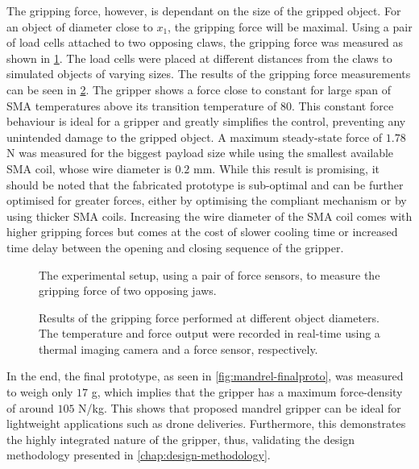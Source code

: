 The gripping force, however, is dependant on the size of the gripped object. For an object of diameter close to $x_1$, the gripping force will be maximal. Using a pair of load cells attached to two opposing claws, the gripping force was measured as shown in \cref{fig:mandrel-forcesetup}. The load cells were placed at different distances from the claws to simulated objects of varying sizes. The results of the gripping force measurements can be seen in \cref{fig:mandrel-force-temp}. The gripper shows a force close to constant for large span of SMA temperatures above its transition temperature of 80\degreeC. This constant force behaviour is ideal for a gripper and greatly simplifies the control, preventing any unintended damage to the gripped object. A maximum steady-state force of $1.78$ N was measured for the biggest payload size while using the smallest available SMA coil, whose wire diameter is $0.2$ mm. While this result is promising, it should be noted that the fabricated prototype is sub-optimal and can be further optimised for greater forces, either by optimising the compliant mechanism or by using thicker SMA coils. Increasing the wire diameter of the SMA coil comes with higher gripping forces but comes at the cost of slower cooling time or increased time delay between the opening and closing sequence of the gripper.

\begin{figure}[hbt!]
    \centering
    \resizebox{\textwidth}{!}{}
    \caption{The experimental setup, using a pair of force sensors, to measure the gripping force of two opposing jaws.}
    \label{fig:mandrel-forcesetup}
\end{figure}

\begin{figure}[hbt!] %
  \centering
  \resizebox{0.9\textwidth}{!}{}
  \caption{Results of the gripping force performed at different object diameters. The temperature and force output were recorded in real-time using a thermal imaging camera and a force sensor, respectively.}
  \label{fig:mandrel-force-temp}
\end{figure}

In the end, the final prototype, as seen in \cref{fig:mandrel-finalproto}, was measured to weigh only $17$ g, which implies that the gripper has a maximum force-density of around $105$ N/kg. This shows that proposed mandrel gripper can be ideal for lightweight applications such as drone deliveries. Furthermore, this demonstrates the highly integrated nature of the gripper, thus, validating the design methodology presented in \cref{chap:design-methodology}.
